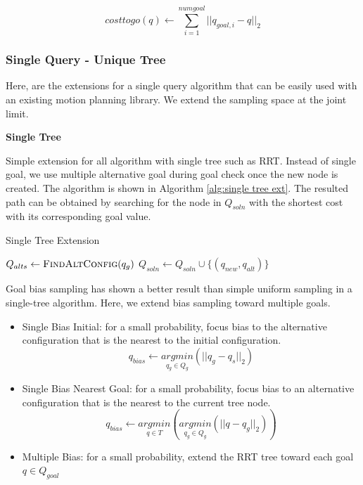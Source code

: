 \begin{equation}
    costtogo(q) \gets \sum_{i=1}^{numgoal} || q_{goal,i} - q ||_2
\end{equation}


\subsubsection{Single Query - Unique Tree}
Here, are the extensions for a single query algorithm that can be easily used with an existing motion planning library. We extend the sampling space at the joint limit.


\textbf{Single Tree}

Simple extension for all algorithm with single tree such as RRT. Instead of single goal, we use multiple alternative goal during goal check once the new node is created. The algorithm is shown in Algorithm \ref{alg:single tree ext}. The resulted path can be obtained by searching for the node in $Q_{soln}$ with the shortest cost with its corresponding goal value.

\begin{algorithm}[!h]
    \small
    \caption{Single Tree Extension}
    \label{alg:single tree ext}
    \begin{algorithmic}
        \State $Q_{alts} \gets \textsc{FindAltConfig}(q_g)$
        \State $Q_{soln} \gets Q_{soln} \cup \{(q_{new}, q_{alt})\}$
        \EndIf
        \EndFor
        \EndFunction
    \end{algorithmic}
\end{algorithm}


Goal bias sampling has shown a better result than simple uniform sampling in a single-tree algorithm. Here, we extend bias sampling toward multiple goals.

\noindent
\begin{itemize}
    \item Single Bias Initial: for a small probability, focus bias to the alternative configuration that is the nearest to the initial configuration.
    \begin{equation}
        q_{bias} \gets \underset{q_g \in Q_g}{argmin}(|| q_g - q_s ||_2)
    \end{equation}
    \item Single Bias Nearest Goal: for a small probability, focus bias to an alternative configuration that is the nearest to the current tree node.
    \begin{equation}
        q_{bias} \gets \underset{q \in T}{argmin}(\underset{q_g \in Q_g}{argmin}(||q - q_g ||_2))
    \end{equation}
    \item Multiple Bias: for a small probability, extend the RRT tree toward each goal $q \in Q_{goal}$
\end{itemize}



